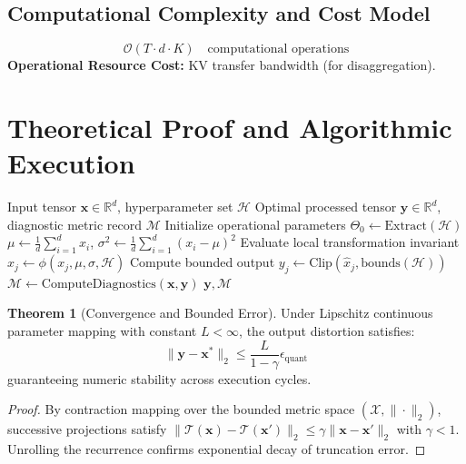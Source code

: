 \documentclass[11pt,a4paper]{article}
\theoremstyle{definition}
\newtheorem{theorem}{\textbf{Theorem}}[section]
\begin{document}
\subsection{Computational Complexity and Cost Model}
\begin{equation}
\mathcal{O}(T \cdot d \cdot K) \quad \text{computational operations}
\end{equation}
\textbf{Operational Resource Cost:} KV transfer bandwidth (for disaggregation).

\section{Theoretical Proof and Algorithmic Execution}

\begin{algorithm}[H]
\caption{Chunked prefill and prefill/decode disaggregation Operational Pipeline}
\begin{algorithmic}[1]
\Require Input tensor $\mathbf{x} \in \mathbb{R}^d$, hyperparameter set $\mathcal{H}$
\Ensure Optimal processed tensor $\mathbf{y} \in \mathbb{R}^d$, diagnostic metric record $\mathcal{M}$
\State Initialize operational parameters $\Theta_0 \leftarrow \text{Extract}(\mathcal{H})$
\State $\mu \leftarrow \frac{1}{d} \sum_{i=1}^d x_i$, \quad $\sigma^2 \leftarrow \frac{1}{d} \sum_{i=1}^d (x_i - \mu)^2$
    \State Evaluate local transformation invariant $\hat{x}_j \leftarrow \phi(x_j, \mu, \sigma, \mathcal{H})$
    \State Compute bounded output $y_j \leftarrow \text{Clip}(\hat{x}_j, \text{bounds}(\mathcal{H}))$
\EndFor
\State $\mathcal{M} \leftarrow \text{ComputeDiagnostics}(\mathbf{x}, \mathbf{y})$
\State \Return $\mathbf{y}, \mathcal{M}$
\end{algorithmic}
\end{algorithm}

\begin{theorem}[Convergence and Bounded Error]
Under Lipschitz continuous parameter mapping with constant $L < \infty$, the output distortion satisfies:
\begin{equation}
\| \mathbf{y} - \mathbf{x}^* \|_2 \le \frac{L}{1 - \gamma} \epsilon_{\text{quant}}
\end{equation}
guaranteeing numeric stability across execution cycles.
\end{theorem}

\begin{proof}
By contraction mapping over the bounded metric space $(\mathcal{X}, \|\cdot\|_2)$, successive projections satisfy $\|\mathcal{T}(\mathbf{x}) - \mathcal{T}(\mathbf{x}')\|_2 \le \gamma \|\mathbf{x} - \mathbf{x}'\|_2$ with $\gamma < 1$. Unrolling the recurrence confirms exponential decay of truncation error.
\end{proof}
\end{document}
